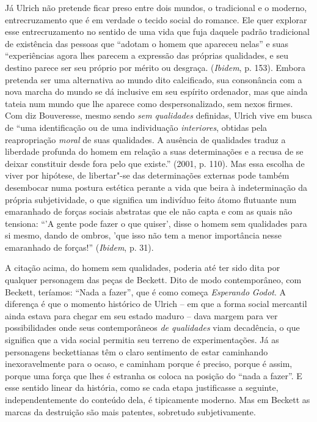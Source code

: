 Já Ulrich não pretende ficar preso entre dois mundos, o tradicional e o
moderno, entrecruzamento que é em verdade o tecido social do romance.
Ele quer explorar esse entrecruzamento no sentido de uma vida que fuja
daquele padrão tradicional de existência das pessoas que ``adotam o
homem que apareceu nelas'' e suas ``experiências agora lhes parecem a
expressão das próprias qualidades, e seu destino parece ser seu próprio
por mérito ou desgraça. (\emph{Ibidem}, p. 153). Embora pretenda ser uma
alternativa ao mundo dito calcificado, sua consonância com a nova marcha
do mundo se dá inclusive em seu espírito ordenador, mas que ainda tateia
num mundo que lhe aparece como despersonalizado, sem nexos firmes. Com
diz Bouveresse, mesmo sendo \emph{sem} \emph{qualidades} definidas,
Ulrich vive em busca de ``uma identificação ou de uma individuação
\emph{interiores}, obtidas pela reapropriação \emph{moral} de suas
qualidades. A ausência de qualidades traduz a liberdade profunda do
homem em relação a suas determinações e a recusa de se deixar constituir
desde fora pelo que existe.'' (2001, p. 110). Mas essa escolha de viver
por hipótese, de libertar"-se das determinações externas pode também
desembocar numa postura estética perante a vida que beira à
indeterminação da própria subjetividade, o que significa um indivíduo
feito átomo flutuante num emaranhado de forças sociais abstratas que ele
não capta e com as quais não tensiona: ``'A gente pode fazer o que
quiser', disse o homem sem qualidades para si mesmo, dando de ombros,
'que isso não tem a menor importância nesse emaranhado de forças!''
(\emph{Ibidem}, p. 31).

A citação acima, do homem sem qualidades, poderia até ter sido dita por
qualquer personagem das peças de Beckett. Dito de modo contemporâneo,
com Beckett, teríamos: ``Nada a fazer'', que é como começa
\emph{Esperando} \emph{Godot}. A diferença é que o momento histórico de
Ulrich -- em que a forma social mercantil ainda estava para chegar em
seu estado maduro -- dava margem para ver possibilidades onde seus
contemporâneos \emph{de qualidades} viam decadência, o que significa que
a vida social permitia seu terreno de experimentações. Já as personagens
beckettianas têm o claro sentimento de estar caminhando inexoravelmente
para o ocaso, e caminham porque é preciso, porque é assim, porque uma
força que lhes é estranha os coloca na posição do ``nada a fazer''. E
esse sentido linear da história, como se cada etapa justificasse a
seguinte, independentemente do conteúdo dela, é tipicamente moderno. Mas
em Beckett as marcas da destruição são mais patentes, sobretudo
subjetivamente.

